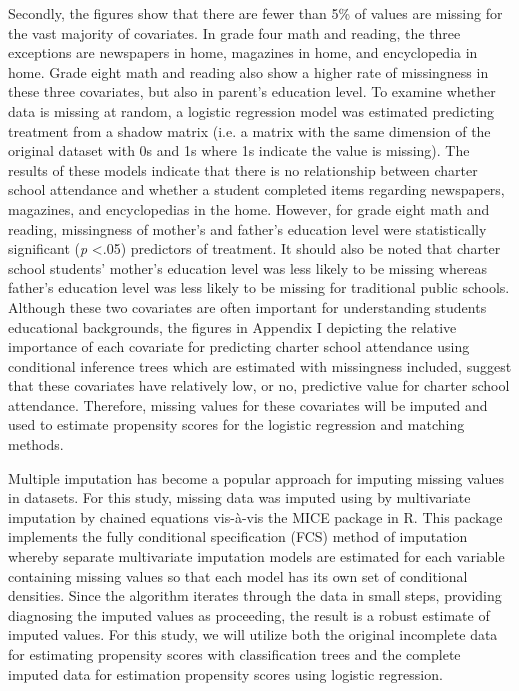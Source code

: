 \documentclass[letterpaper,12p,twoside]{article} %
\begin{document}
Secondly, the figures show that there are fewer than 5\% of values are missing for the vast majority of covariates. In grade four math and reading, the three exceptions are newspapers in home, magazines in home, and encyclopedia in home. Grade eight math and reading also show a higher rate of missingness in these three covariates, but also in parent's education level. To examine whether data is missing at random, a logistic regression model was estimated predicting treatment from a shadow matrix (i.e. a matrix with the same dimension of the original dataset with 0s and 1s where 1s indicate the value is missing). The results of these models indicate that there is no relationship between charter school attendance and whether a student completed items regarding newspapers, magazines, and encyclopedias in the home. However, for grade eight math and reading, missingness of mother's and father's education level were statistically significant (\textit{p} \textless .05) predictors of treatment. It should also be noted that charter school students' mother's education level was less likely to be missing whereas father's education level was less likely to be missing for traditional public schools. Although these two covariates are often important for understanding students educational backgrounds, the figures in Appendix I depicting the relative importance of each covariate for predicting charter school attendance using conditional inference trees which are estimated with missingness included, suggest that these covariates have relatively low, or no, predictive value for charter school attendance. Therefore, missing values for these covariates will be imputed and used to estimate propensity scores for the logistic regression and matching methods. 

Multiple imputation \cite{rubin1987,Rubin1996mi} has become a popular approach for imputing missing values in datasets. For this study, missing data was imputed using  by multivariate imputation by chained equations vis-\`a-vis the MICE package  in R. This package implements the fully conditional specification (FCS) method of imputation whereby separate multivariate imputation models are estimated for each variable containing missing values so that each model has its own set of conditional densities. Since the algorithm iterates through the data in small steps, providing diagnosing the imputed values as proceeding, the result is a robust estimate of imputed values. For this study, we will utilize both the original incomplete data for estimating propensity scores with classification trees and the complete imputed data for estimation propensity scores using logistic regression.
\end{document}
